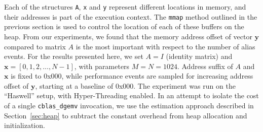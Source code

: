 \documentclass[10pt, conference, compsocconf]{IEEEtran}
\begin{document}
Each of the structures \texttt{A}, \texttt{x} and \texttt{y} represent different locations in memory, and their addresses is part of the execution context.
The \texttt{mmap} method outlined in the previous section is used to control the location of each of these buffers on the heap.
From our experiments, we found that the memory address offset of vector $\boldsymbol{y}$ compared to matrix $A$ is the most important with respect to the number of alias events.
For the results presented here, we set $A = I$ (identity matrix) and $\boldsymbol{x} = [0, 1, 2, ..., N-1]$, with parameters $M = N = 1024$.
Address suffix of $A$ and $\boldsymbol{x}$ is fixed to 0x000, while performance events are sampled for increasing address offset of $\boldsymbol{y}$, starting at a baseline of 0x000.
The experiment was run on the ``Haswell'' setup, with Hyper-Threading enabled.
In an attempt to isolate the cost of a single \texttt{cblas_dgemv} invocation, we use the estimation approach described in Section~\ref{sec:heap} to subtract the constant overhead from heap allocation and initialization.
\end{document}
